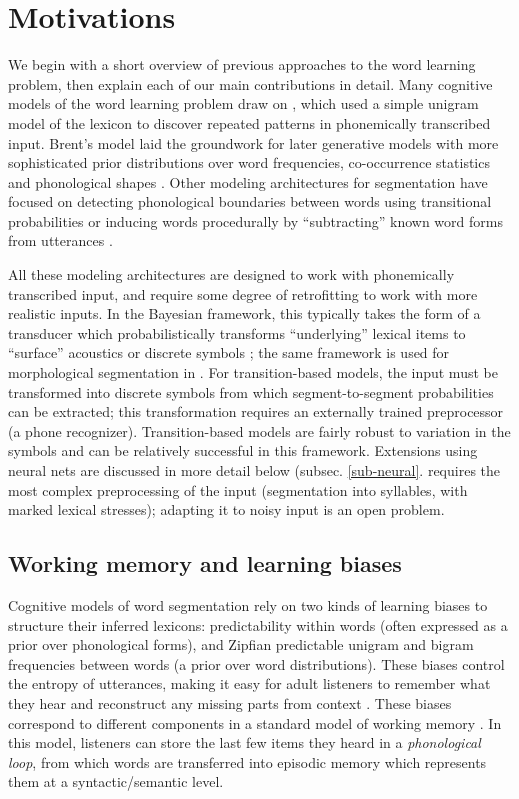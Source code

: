 \documentclass[11pt,letterpaper]{article}
\begin{document}
\section{Motivations}

We begin with a short overview of previous approaches to the word
learning problem, then explain each of our main contributions in
detail. Many cognitive models of the word learning problem draw on
, which used a simple unigram model of the lexicon to
discover repeated patterns in phonemically transcribed input. Brent's
model laid the groundwork for later generative models with more
sophisticated prior distributions over word frequencies, co-occurrence
statistics and phonological shapes \cite[among
  others]{Johnson09}. Other modeling architectures for segmentation
have focused on detecting phonological boundaries between words using
transitional probabilities \cite[among others]{Christiansen98} or
inducing words procedurally by ``subtracting'' known word forms from
utterances \cite{Lignos11}.

All these modeling architectures are designed to work with
phonemically transcribed input, and require some degree of
retrofitting to work with more realistic inputs. In the Bayesian
framework, this typically takes the form of a transducer which
probabilistically transforms ``underlying'' lexical items to
``surface'' acoustics \cite{Lee15} or discrete symbols
\cite{Elsner13}; the same framework is used for morphological
segmentation in . For transition-based models,
the input must be transformed into discrete symbols from which
segment-to-segment probabilities can be extracted; this transformation
requires an externally trained preprocessor (a phone
recognizer). Transition-based models are fairly robust to variation in
the symbols \cite{Rytting07,Rytting08,Daland10,Fleck08} and can be relatively
successful in this framework. Extensions using neural nets
\cite{Christiansen98,Rytting08} are discussed in more detail below
(subsec. \ref{sub-neural}.  requires the most
complex preprocessing of the input (segmentation into syllables, with
marked lexical stresses); adapting it to noisy input is an open
problem.

\subsection{Working memory and learning biases}

Cognitive models of word segmentation rely on two kinds of learning
biases to structure their inferred lexicons: predictability within
words (often expressed as a prior over phonological forms), and
Zipfian predictable unigram and bigram frequencies between words (a
prior over word distributions). These biases control the entropy of
utterances, making it easy for adult listeners to remember what they
hear and reconstruct any missing parts from context
\cite{Piantadosi12}. These biases correspond to different components
in a standard model of working memory \cite{Baddeley07,Baddeley74}. In
this model, listeners can store the last few items they heard in a
\textit{phonological loop}, from which words are transferred into
episodic memory which represents them at a syntactic/semantic level.
\end{document}
